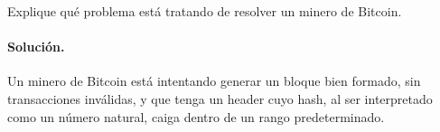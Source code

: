 Explique qué problema está tratando de resolver un minero de Bitcoin.

\paragraph{Solución.} Un minero de Bitcoin está intentando generar un bloque bien formado, sin transacciones inválidas, y que tenga un header cuyo hash, al ser interpretado como un número natural, caiga dentro de un rango predeterminado.
